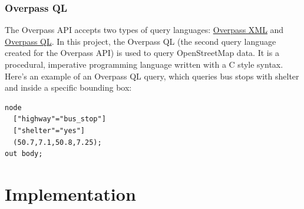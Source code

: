 \subsubsection{Overpass QL}
The Overpass API accepts two types of query languages: \href{https://wiki.openstreetmap.org/wiki/Overpass_API/Language_Guide#The_Overpass_API_languages}{Overpass XML}
and \href{https://wiki.openstreetmap.org/wiki/Overpass_API/Overpass_QL}{Overpass QL}.
In this project, the Overpass QL (the second query language created for the Overpass API) is used to query OpenStreetMap data.
It is a procedural, imperative programming language written with a C style syntax. \cite{WhatIsOverpassQL}\\
\newline
Here's an example of an Overpass QL query, which queries bus stops with shelter and inside a specific bounding box:\\
\begin{verbatim}
node
  ["highway"="bus_stop"]
  ["shelter"="yes"]
  (50.7,7.1,50.8,7.25);
out body;
\end{verbatim}
\pagebreak
\section{Implementation}
